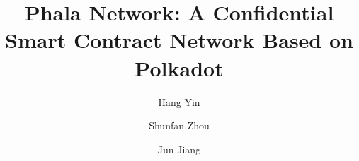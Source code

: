 \documentclass{article}
\begin{document}
\title{Phala Network: A Confidential Smart Contract Network Based on Polkadot}

\author{
    Hang Yin
    \and
    Shunfan Zhou
    \and
    Jun Jiang
}

\maketitle

% 







\end{document}
